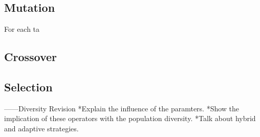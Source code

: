 \subsection{Mutation}
For each ta

\subsection{Crossover}

\subsection{Selection}

%
%




------Diversity Revision
*Explain the influence of the paramters.
*Show the implication of these operators with the population diversity.
*Talk about hybrid and adaptive strategies.

